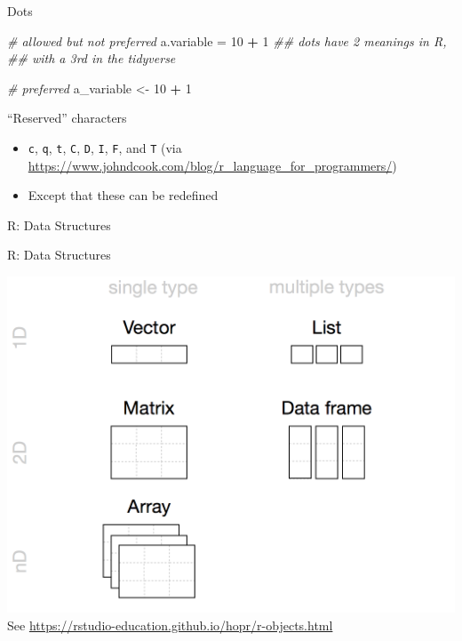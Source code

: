 \documentclass[
  ignorenonframetext,
]{beamer}
\newenvironment{Shaded}{\begin{snugshade}}{\end{snugshade}}
\newcommand{\CommentTok}[1]{\textcolor[rgb]{0.56,0.35,0.01}{\textit{#1}}}
\newcommand{\DecValTok}[1]{\textcolor[rgb]{0.00,0.00,0.81}{#1}}
\newcommand{\NormalTok}[1]{#1}
\newcommand{\OperatorTok}[1]{\textcolor[rgb]{0.81,0.36,0.00}{\textbf{#1}}}
\newcommand{\StringTok}[1]{\textcolor[rgb]{0.31,0.60,0.02}{#1}}
\providecommand{\tightlist}{%
  \setlength{\itemsep}{0pt}\setlength{\parskip}{0pt}}
\begin{document}
\begin{frame}[fragile]{Dots}
\protect\hypertarget{dots}{}

\begin{Shaded}
\begin{Highlighting}[]
\CommentTok{# allowed but not preferred}
\NormalTok{a.variable =}\StringTok{ }\DecValTok{10} \OperatorTok{+}\StringTok{ }\DecValTok{1}
  \CommentTok{## dots have 2 meanings in R, }
    \CommentTok{## with a 3rd in the tidyverse}

\CommentTok{# preferred}
\NormalTok{a_variable <-}\StringTok{ }\DecValTok{10} \OperatorTok{+}\StringTok{ }\DecValTok{1}
\end{Highlighting}
\end{Shaded}

\end{frame}

\begin{frame}[fragile]{``Reserved'' characters}
\protect\hypertarget{reserved-characters}{}

\begin{itemize}[<+->]
\tightlist
\item
  \texttt{c}, \texttt{q}, \texttt{t}, \texttt{C}, \texttt{D},
  \texttt{I}, \texttt{F}, and \texttt{T} (via
  \url{https://www.johndcook.com/blog/r_language_for_programmers/})
\item
  Except that these can be redefined
\end{itemize}

\end{frame}

\begin{frame}{R: Data Structures}
\protect\hypertarget{r-data-structures}{}

\end{frame}

\begin{frame}{R: Data Structures}
\protect\hypertarget{r-data-structures-1}{}

\includegraphics{../external/images/rstudio_datastructs.png} See
\url{https://rstudio-education.github.io/hopr/r-objects.html}

\end{frame}
\end{document}
